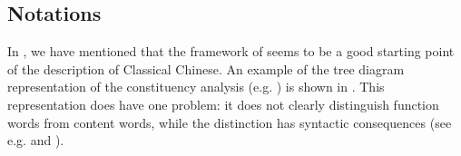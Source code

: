 \documentclass[UTF8, a4paper, oneside, scheme=plain, 12pt]{ctexrep}
\newcommand*{\citepage}[1]{p.~{#1}}
\begin{document}
\subsection{Notations}

In , we have mentioned that the framework of \citet{cgel} seems to be a good starting point of the description of Classical Chinese.
An example of the tree diagram representation of the constituency analysis (e.g. \citealt[\citepage{954} {[9]}]{cgel}) is shown in .
This representation does have one problem:
it does not clearly distinguish function words from content words,
while the distinction has syntactic consequences 
(see e.g.  and ).
\end{document}
